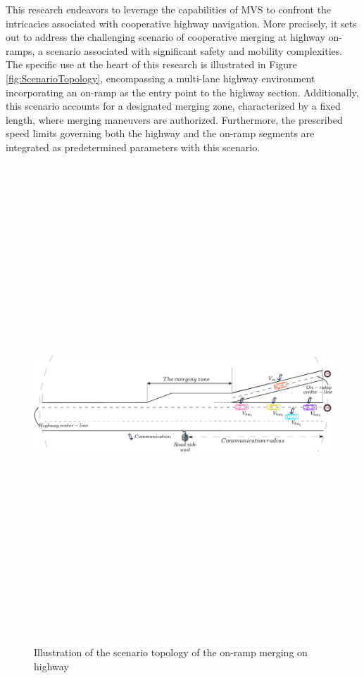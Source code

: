 This research endeavors to leverage the capabilities of MVS to confront the intricacies associated with cooperative highway navigation. More precisely, it sets out to address the challenging scenario of cooperative merging at highway on-ramps, a scenario associated with significant safety and mobility complexities. The specific use at the heart of this research is illustrated in Figure \ref{fig:ScenarioTopology}, encompassing a multi-lane highway environment incorporating an on-ramp as the entry point to the highway section. Additionally, this scenario accounts for a designated merging zone, characterized by a fixed length, where merging maneuvers are authorized. Furthermore, the prescribed speed limits governing both the highway and the on-ramp segments are integrated as predetermined parameters with this scenario. 



        \begin{figure}[!h]
        \centering 
        \includegraphics[width=12.5cm,height=18cm,keepaspectratio]{chapters/Chapitre_4/Figures/ScenarioScene.pdf}
        \vspace{-2.3mm}
        \caption{Illustration of the scenario topology of the on-ramp merging on highway}
        \label{fig:ScenarioTopology}\label{fig:RSU-identification}
        \end{figure}




